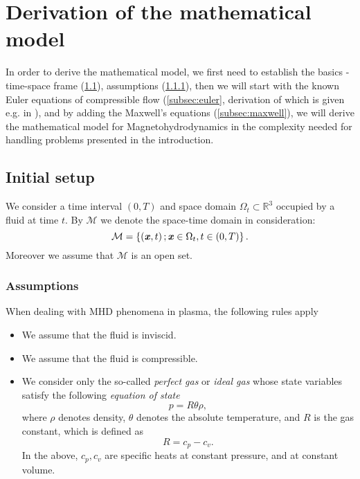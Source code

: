 \section{Derivation of the mathematical model}
In order to derive the mathematical model, we first need to establish the basics - time-space frame (\cref{subsec:init}), assumptions (\cref{subsec:assump}), then we will start with the known Euler equations of compressible flow (\cref{subsec:euler}, derivation of which is given e.g. in \cite{diplomka}), and by adding the Maxwell's equations (\cref{subsec:maxwell}), we will derive the mathematical model for Magnetohydrodynamics in the complexity needed  for handling problems presented in the introduction.
\subsection{Initial setup}
\label{subsec:init}

We consider a time interval $\left(0,T\right)$ and space domain $\Omega_{t}\subset \mathbb{R}^3$ occupied by a fluid at time $t$.
By $\mathcal{M}$ we denote the space-time domain in consideration: 
\begin{equation}\label{M}
\mathcal{M}=\left\{\left(\textbf{\textit{x}},t\right);\\\textbf{\textit{x}}\in\Omega_{t},t\in\left(0,T\right)\right \}.
\end{equation}
Moreover we assume that $\mathcal{M}$ is an open set.

\subsubsection{Assumptions}
\label{subsec:assump}
When dealing with MHD phenomena in plasma, the following rules apply
\begin{itemize}
    \item We assume that the fluid is inviscid.
    \item We assume that the fluid is compressible.
    \item We consider only the so-called \textit{perfect gas} or \textit{ideal gas} whose state variables satisfy the following \textit{equation of state}
    \begin{equation}\label{start_therm}
    p = R\theta\rho,
    \end{equation}
    where $\rho$ denotes density, $\theta$ denotes the absolute temperature, and $R$ is the gas constant, which is defined as 
    \begin{equation}
    R = c_p - c_v.
    \end{equation}
    In the above, $c_p, c_v$ are specific heats at constant pressure, and at constant volume.
\end{itemize}

